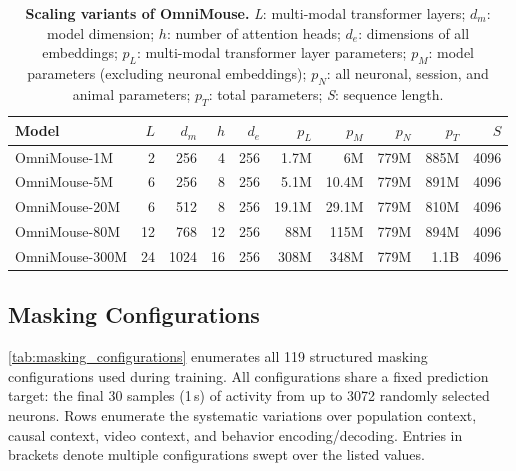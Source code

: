 \documentclass{article} %
\begin{document}
\begin{table}[H]
\centering
\caption{\textbf{Scaling variants of OmniMouse.}
\textit{L}: multi-modal transformer layers; $d_m$: model dimension; $h$: number of attention heads; $d_e$: dimensions of all embeddings; $p_L$: multi-modal transformer layer parameters; $p_M$: model parameters (excluding neuronal embeddings); $p_N$: all neuronal, session, and animal parameters; $p_T$: total parameters; \textit{S}: sequence length. 
}
\vspace{8pt}
\small %
\begin{tabular*}{\textwidth}{@{}l@{\extracolsep{\fill}}rrrrrrrrr@{}}
\toprule
\textbf{Model} & \textbf{$L$} & \textbf{$d_m$} & \textbf{$h$} & \textbf{$d_e$} & \textbf{$p_L$} & \textbf{$p_M$} & \textbf{$p_N$} & \textbf{$p_T$} & \textbf{$S$} \\
\midrule
OmniMouse-1M   & 2  & 256  & 4   & 256  & 1.7M  & 6M  & 779M  & 885M  & 4096 \\
OmniMouse-5M   & 6  & 256  & 8   & 256  & 5.1M  & 10.4M  & 779M  & 891M  & 4096 \\
OmniMouse-20M  & 6  & 512  & 8   & 256  & 19.1M & 29.1M & 779M  & 810M & 4096 \\
OmniMouse-80M  & 12 & 768  & 12  & 256  & 88M & 115M & 779M & 894M & 4096 \\
OmniMouse-300M & 24 & 1024 & 16  & 256 & 308M & 348M & 779M & 1.1B & 4096 \\
\bottomrule
\end{tabular*}
\label{tab:bigmouse_architectures}
\end{table}


\subsection{Masking Configurations}

\cref{tab:masking_configurations} enumerates all 119 structured masking configurations used during training. All configurations share a fixed prediction target: the final 30 samples (1\,s) of activity from up to 3072 randomly selected neurons. Rows enumerate the systematic variations over population context, causal context, video context, and behavior encoding/decoding. Entries in brackets denote multiple configurations swept over the listed values.
\end{document}
